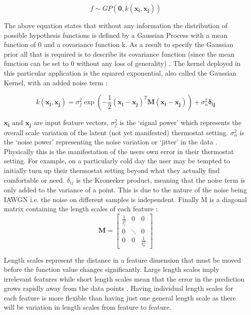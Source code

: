\documentclass[10.5pt,a4paper,twoside]{report}   %
\begin{document}
\begin{equation}
    f \sim GP(\boldsymbol{0},k \left( \boldsymbol{x_i},\boldsymbol{x_j} \right))
\end{equation}	

The above equation states that without any information the distribution of possible hypothesis functions is defined by a Gaussian Process with a mean function of 0 and a covariance function k.  As a result to specify the Gaussian prior all that is required is to describe its covariance function (since the mean function can be set to 0 without any loss of generality) \cite{MITGPRbook}
. The kernel deployed in this particular application is the squared exponential, also called the Gaussian Kernel, with an added noise term \cite{MITGPRbook}:

\begin{equation}
    k \left( \boldsymbol{x_i},\boldsymbol{x_j} \right)=\sigma_{f}^2 \exp\left(-\dfrac{1}{2} {\left( \boldsymbol{x_i}-\boldsymbol{x_j} \right)}^T \boldsymbol{M} \left( \boldsymbol{x_i}-\boldsymbol{x_j} \right)\right) + \sigma_n^2 \boldsymbol{\delta_{ij}}
\end{equation}	

$\boldsymbol{x_i} \text{ and }\boldsymbol{x_j}$\textbf{ }are input feature vectors,  ${\sigma }^2_f$ is the `signal power' which represents the overall scale variation of the latent (not yet manifested) thermostat setting. ${\sigma }^2_n$ is the `noise power' representing the noise variation or `jitter' in the data \cite{dukegpr}. Physically this is the manifestation of the users own error in their thermostat setting. For example, on a particularly cold day the user may be tempted to initially turn up their thermostat setting beyond what they actually find comfortable or need. ${\delta }_{ij}$ is the Kronecker product, meaning that the noise term is only added to the variance of a point\cite{dukegpr}. This is due to the nature of the noise being IAWGN i.e. the noise on different samples is independent. Finally M is a diagonal matrix containing the length scales of each feature \cite{MITGPRbook}:
\begin{equation}
\boldsymbol{M} = \left[ \begin{array}{ccc}
\frac{1}{l^2_1} & 0 & 0 \\ 
0 & \ddots  & 0 \\ 
0 & 0 & \frac{1}{l^2_n} \end{array}
\right]
\end{equation}

Length scales represent the distance in a feature dimension that must be moved before the function value changes significantly. Large length scales imply irrelevant features while short length scales mean that the error in the prediction grows rapidly away from the data points \cite{dukegpr}. Having individual length scales for each feature is more flexible than having just one general length scale as there will be variation in length scales from feature to feature. 
\end{document}
